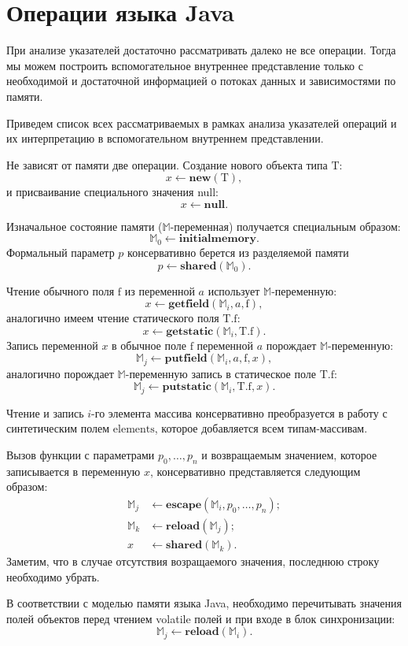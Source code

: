 \documentclass[14pt,titlepage]{extarticle}
\newcommand{\M}{\ensuremath{\mathbb{M}}}
\newcommand{\Mhyp}{$\mathbb{M}$\hyp}
\newcommand{\NEW}{\textbf{new}}
\newcommand{\NULL}{\textbf{null}}
\newcommand{\INITIALMEMORY}{\textbf{initialmemory}}
\newcommand{\GETFIELD}{\textbf{getfield}}
\newcommand{\PUTFIELD}{\textbf{putfield}}
\newcommand{\GETSTATIC}{\textbf{getstatic}}
\newcommand{\PUTSTATIC}{\textbf{putstatic}}
\newcommand{\ESCAPE}{\textbf{escape}}
\newcommand{\SHARED}{\textbf{shared}}
\newcommand{\RELOAD}{\textbf{reload}}
\newcommand{\eng}[1]{{\English#1}}
\let\oldsection\section
\renewcommand{\section}{\newpage\oldsection}
\newcommand{\sectionwithoutnumber}[1]{
  \section*{#1}
  \addcontentsline{toc}{section}{#1}
}
\newcommand{\java}{\eng{Java}\xspace}
\begin{document}
  \sectionwithoutnumber{Операции языка Java}

    При анализе указателей достаточно рассматривать далеко не все операции.
    Тогда мы можем построить вспомогательное внутреннее представление только с
    необходимой и достаточной информацией о потоках данных и зависимостями по
    памяти.

    Приведем список всех рассматриваемых в рамках анализа указателей операций и
    их интерпретацию в вспомогательном внутреннем представлении.

    Не зависят от памяти две операции. Создание нового объекта типа
    $\textrm{T}$:
    \[ x \leftarrow \NEW(\textrm{T}), \]
    и присваивание специального значения null:
    \[ x \leftarrow \NULL. \]

    Изначальное состояние памяти (\Mhyp переменная) получается специальным
    образом:
    \[ \M_0 \leftarrow \INITIALMEMORY. \]
    Формальный параметр $p$ консервативно берется из разделяемой памяти
    \[ p \leftarrow \SHARED(\M_0). \]

    Чтение обычного поля $\textrm{f}$ из переменной $a$ использует
    \Mhyp переменную:
    \[ x \leftarrow \GETFIELD(\M_i, a, \textrm{f}), \]
    аналогично имеем чтение статического поля $\textrm{T.f}$:
    \[ x \leftarrow \GETSTATIC(\M_i, \textrm{T.f}). \]
    Запись переменной $x$ в обычное поле $\textrm{f}$ переменной $a$ порождает
    \Mhyp переменную:
    \[ \M_j \leftarrow \PUTFIELD(\M_i, a, \textrm{f}, x), \]
    аналогично порождает \Mhyp переменную запись в статическое поле $\textrm{T.f}$:
    \[ \M_j \leftarrow \PUTSTATIC(\M_i, \textrm{T.f}, x). \]

    Чтение и запись $i$-го элемента массива консервативно преобразуется в
    работу с синтетическим полем $\textrm{elements}$, которое добавляется всем
    типам-массивам.

    Вызов функции с параметрами $p_0, \ldots, p_n$ и возвращаемым значением,
    которое записывается в переменную $x$, консервативно представляется
    следующим образом:
    \[\begin{aligned}
      \M_j &\leftarrow \ESCAPE(\M_i, p_0, \ldots, p_n); \\
      \M_k &\leftarrow \RELOAD(\M_j); \\
      x  &\leftarrow \SHARED(\M_k).
    \end{aligned}\]
    Заметим, что в случае отсутствия возращаемого значения, последнюю строку
    необходимо убрать.

    В соответствии с моделью памяти языка \java, необходимо перечитывать
    значения полей объектов перед чтением \eng{volatile} полей и при входе в
    блок синхронизации:
    \[ \M_j \leftarrow \RELOAD(\M_i). \]

  \newpage
  
\end{document}
